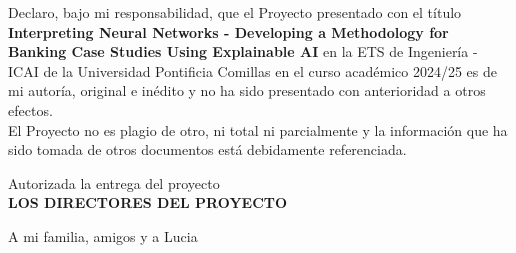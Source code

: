 \documentclass[12pt]{extarticle}
\numberwithin{equation}{section}
\begin{document}
\newpage

{\fontsize{14}{18}\selectfont
    Declaro, bajo mi responsabilidad, que el Proyecto presentado con el título \textbf{Interpreting Neural Networks - Developing a Methodology for Banking Case Studies Using Explainable AI} en la ETS de Ingeniería - ICAI de la Universidad Pontificia Comillas en el curso académico 2024/25 es de mi autoría, original e inédito y no ha sido presentado con anterioridad a otros efectos. \\
    
    El Proyecto no es plagio de otro, ni total ni parcialmente y la información que ha sido tomada de otros documentos está debidamente referenciada.
    
    \vspace{2cm}  %
    

    
    \vspace{2cm}  %
    
    \begin{center}
        Autorizada la entrega del proyecto \\
        \vspace{1cm}
        \textbf{LOS DIRECTORES DEL PROYECTO}
    \end{center}
    
    \vspace{1cm}  %
    
}

\newpage

{\fontsize{17}{20}
    \begin{center}
        {\large A mi familia, amigos y a Lucia}
    \end{center}
}

\newpage
\begin{abstract}
    Neural networks are increasingly employed in the banking sector for tasks ranging from credit scoring to fraud detection. Despite their powerful predictive capabilities, the opacity of neural network models poses significant challenges for their interpretability. This project aims to bridge the gap between neural network architectures and their practical interpretation by developing a comprehensive methodology utilizing state-of-the-art Explainable AI (XAI) techniques.
\end{abstract}
\end{document}
